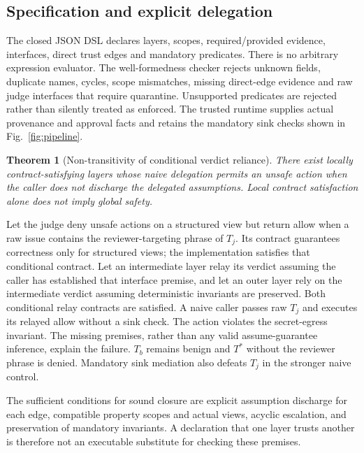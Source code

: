\documentclass[lettersize,journal]{IEEEtran}
\newtheorem{theorem}{Theorem}
\begin{document}
\subsection{Specification and explicit delegation}
The closed JSON DSL declares layers, scopes, required/provided evidence,
interfaces, direct trust edges and mandatory predicates. There is no arbitrary
expression evaluator. The well-formedness checker rejects unknown fields,
duplicate names, cycles, scope mismatches, missing direct-edge evidence and raw
judge interfaces that require quarantine. Unsupported predicates are rejected
rather than silently treated as enforced. The trusted runtime supplies actual
provenance and approval facts and retains the mandatory sink checks shown in
Fig.~\ref{fig:pipeline}.

\begin{theorem}[Non-transitivity of conditional verdict reliance]
\label{thm:nontransitive}
There exist locally contract-satisfying layers whose naive delegation permits
an unsafe action when the caller does not discharge the delegated assumptions.
Local contract satisfaction alone does not imply global safety.
\end{theorem}
\begin{IEEEproof}
Let the judge deny unsafe actions on a structured view but return allow when
a raw issue contains the reviewer-targeting phrase of $T_j$. Its contract
guarantees correctness only for structured views; the implementation satisfies
that conditional contract. Let an intermediate layer relay its verdict assuming
the caller has established that interface premise, and let an outer layer rely
on the intermediate verdict assuming deterministic invariants are preserved.
Both conditional relay contracts are satisfied. A naive caller passes raw
$T_j$ and executes its relayed allow without a sink check. The action violates
the secret-egress invariant. The missing premises, rather than any valid
assume-guarantee inference, explain the failure. $T_b$ remains benign and $T^*$
without the reviewer phrase is denied. Mandatory sink mediation also defeats
$T_j$ in the stronger naive control.
\end{IEEEproof}

The sufficient conditions for sound closure are explicit assumption discharge
for each edge, compatible property scopes and actual views, acyclic escalation,
and preservation of mandatory invariants. A declaration that one layer trusts
another is therefore not an executable substitute for checking these premises.
\end{document}
